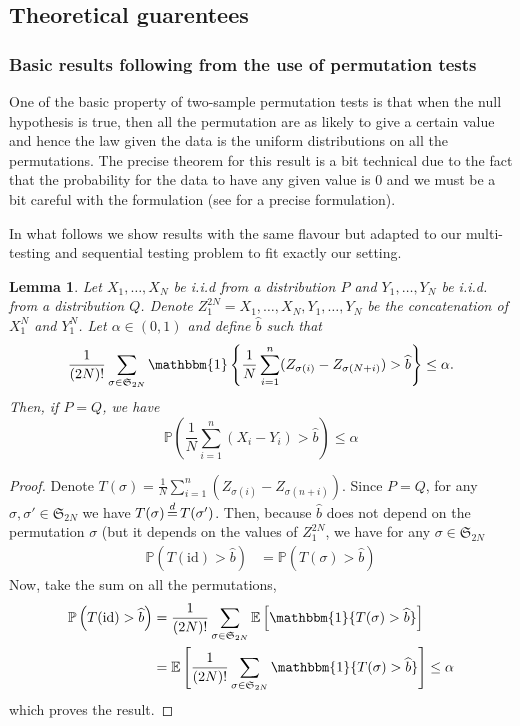\documentclass{article}
\theoremstyle{plain}
\newtheorem{Lemma}{Lemma}
\theoremstyle{remark}
\renewcommand{\P}{\mathbb{P}}
\newcommand{\E}{\mathbb{E}}
\renewcommand{\S}{\mathfrak{S}}
\newcommand{\1}{\mathbbm{1}}
\newcommand{\id}{\mathrm{id}}
\newcommand{\dec}{\,{\buildrel d \over =}\,}
\newcommand{\todoT}[1]{\todo[inline,color=blue!40]{{\textbf{T:}~}#1}}
\numberwithin{equation}{section}
\begin{document}
\newpage

\subsection{Theoretical guarentees}
\subsubsection{Basic results following from the use of permutation tests}
One of the basic property of two-sample permutation tests is that when the null hypothesis is true, then all the permutation are as likely to give a certain value and hence the law given the data is the uniform distributions on all the permutations. The precise theorem for this result is a bit technical due to the fact that the probability for the data to have any given value is $0$ and we must be a bit careful with the formulation (see \cite[Theorem 17.2.2]{lehmann2005testing} for a precise formulation). 

In what follows we show results with the same flavour but adapted to our multi-testing and sequential testing problem to fit exactly our setting.
\begin{Lemma}\label{lem:quantile_permu_2}
  Let $X_1,\dots,X_N$ be i.i.d from a distribution $P$ and $Y_1,\dots,Y_N$ be i.i.d. from a distribution $Q$. Denote $Z_1^{2N}=X_1,\dots,X_N,Y_1,\dots,Y_N$ be the concatenation of $X_1^N$ and $Y_1^N$. Let $\alpha \in (0,1)$ and define $\widehat{b}$ such that 
  $$ \frac{1}{(2N)!}\sum_{\sigma\in \S_{2N}} \1\left\{ \frac{1}{N}\sum_{i=1}^n (Z_{\sigma(i)}-Z_{\sigma(N+i)}) > \widehat{b}\right\}\le \alpha.$$
  Then, if $P=Q$, we have 
  $$\P\left(\frac{1}{N}\sum_{i=1}^n (X_i-Y_i) >\widehat{b} \right)\le \alpha $$ 
\end{Lemma}
\begin{proof}
  Denote $T(\sigma)= \frac{1}{N}\sum_{i=1}^n (Z_{\sigma(i)}-Z_{\sigma(n+i)})$. Since $P=Q$, for any $\sigma,\sigma' \in \S_{2N}$ we have $T(\sigma)\dec T(\sigma')$. Then, because $\widehat{b}$ does not depend on the permutation $\sigma$ (but it depends on the values of $Z_1^{2N}$, we have for any $\sigma \in \S_{2N}$
  \begin{align*}
    \P\left(T(\id)> \widehat{b}\right)&=\P\left(T(\sigma)> \widehat{b}\right)
  \end{align*} 
  Now, take the sum on all the permutations, 
  \begin{align*}
    \P\left(T(\id)> \widehat{b}\right)&=\frac{1}{(2N)!}\sum_{\sigma\in \S_{2N}} \E\left[\1\{T(\sigma)> \widehat{b}\}\right]\\
                                      &=  \E\left[\frac{1}{(2N)!}\sum_{\sigma\in \S_{2N}}\1\{T(\sigma)> \widehat{b}\}\right]\le \alpha
  \end{align*}
  which proves the result.
\end{proof}
\end{document}
